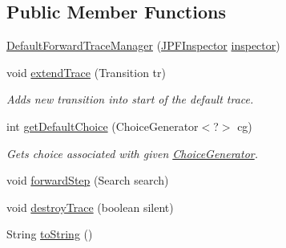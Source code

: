 \subsection*{Public Member Functions}
\begin{DoxyCompactItemize}
\item 
\hyperlink{classgov_1_1nasa_1_1jpf_1_1inspector_1_1server_1_1breakpoints_1_1_default_forward_trace_manager_a85a14a24475bd6d16939d2e72bd3c283}{Default\+Forward\+Trace\+Manager} (\hyperlink{classgov_1_1nasa_1_1jpf_1_1inspector_1_1server_1_1jpf_1_1_j_p_f_inspector}{J\+P\+F\+Inspector} \hyperlink{classgov_1_1nasa_1_1jpf_1_1inspector_1_1server_1_1breakpoints_1_1_default_forward_trace_manager_a7a495164429696989989854362749bcb}{inspector})
\item 
void \hyperlink{classgov_1_1nasa_1_1jpf_1_1inspector_1_1server_1_1breakpoints_1_1_default_forward_trace_manager_abe8759c66fb8fdf35d55b64a70a72101}{extend\+Trace} (Transition tr)
\begin{DoxyCompactList}\small\item\em Adds new transition into start of the default trace. \end{DoxyCompactList}\item 
int \hyperlink{classgov_1_1nasa_1_1jpf_1_1inspector_1_1server_1_1breakpoints_1_1_default_forward_trace_manager_a5e478c76207004e5d971178560c255df}{get\+Default\+Choice} (Choice\+Generator$<$?$>$ cg)
\begin{DoxyCompactList}\small\item\em Gets choice associated with given \hyperlink{}{Choice\+Generator}. \end{DoxyCompactList}\item 
void \hyperlink{classgov_1_1nasa_1_1jpf_1_1inspector_1_1server_1_1breakpoints_1_1_default_forward_trace_manager_ae4044b229d383c2bc4375d1dadf70f0c}{forward\+Step} (Search search)
\item 
void \hyperlink{classgov_1_1nasa_1_1jpf_1_1inspector_1_1server_1_1breakpoints_1_1_default_forward_trace_manager_ac5e4e8802d8b3ccea7df4dd3b3a45357}{destroy\+Trace} (boolean silent)
\item 
String \hyperlink{classgov_1_1nasa_1_1jpf_1_1inspector_1_1server_1_1breakpoints_1_1_default_forward_trace_manager_a060392baa55d0a0d5c1978dd38875985}{to\+String} ()
\end{DoxyCompactItemize}
